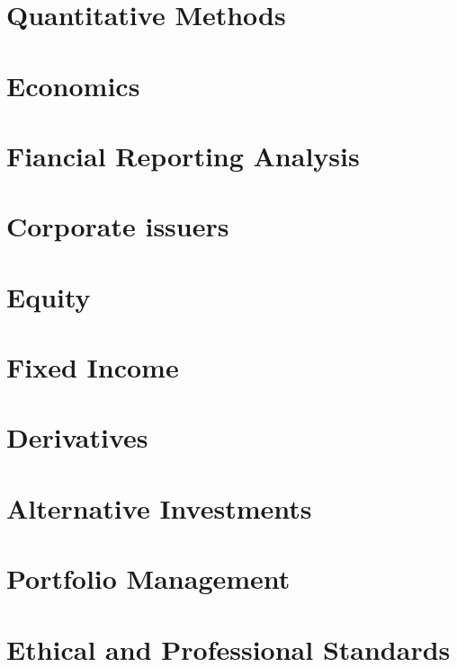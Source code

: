 


\specialsectioning
\chapter{ Quantitative Methods}

\chapter{ Economics}

\chapter{ Fiancial Reporting Analysis}

\chapter{ Corporate issuers}

\chapter{ Equity}

\chapter{ Fixed Income}

\chapter{ Derivatives}

\chapter{ Alternative Investments}

\chapter{ Portfolio Management}

\chapter{ Ethical and Professional Standards}


